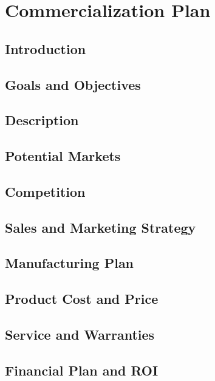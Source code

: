 \chapter{Commercialization Plan}

\section{Introduction}

\section{Goals and Objectives}

\section{Description}

\section{Potential Markets}

\section{Competition}

\section{Sales and Marketing Strategy}

\section{Manufacturing Plan}

\section{Product Cost and Price}

\section{Service and Warranties}

\section{Financial Plan and ROI}